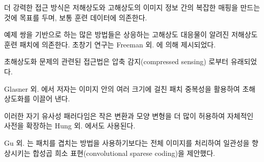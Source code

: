 \documentclass[10pt,twocolumn,letterpaper]{article}
\newcommand{\kor}[1]{#1}
\newcommand{\eng}[1]{}
\begin{document}
\eng{
More powerful approaches aim to establish a complex mapping between low- and high-resolution image information and usually rely on training data.
}\kor{
더 강력한 접근 방식은 저해상도와 고해상도의 이미지 정보 간의 복잡한 매핑을 만드는 것에 목표를 두며, 보통 훈련 데이터에 의존한다.
}\eng{
Many methods that are based on example-pairs rely on \ac{LR} training patches for which the corresponding \ac{HR} counterparts are known. Early work was presented by Freeman et al. \cite{Freeman2000,Freeman2002}.
}\kor{
예제 쌍을 기반으로 하는 많은 방법들은 상응하는 \ac{고해상도} 대응물이 알려진 \ac{저해상도} 훈련 패치에 의존한다. 초창기 연구는 Freeman 외. \cite{Freeman2000,Freeman2002}에 의해 제시되었다.
}\eng{
Related approaches to the \ac{SR} problem originate in compressed sensing \cite{Yang08, Dong2011, zeyde2012single}.
}\kor{
\ac{초해상도화} 문제의 관련된 접근법은 압축 감지(compressed sensing) \cite{Yang08, Dong2011, zeyde2012single}로부터 유래되었다.
}
    \eng{
    In Glasner et al. \cite{glasner2009super} the authors exploit patch redundancies across scales within the image to drive the \ac{SR}.
    }\kor{
    Glasner 외. \cite{glasner2009super}에서 저자는 이미지 안의 여러 크기에 걸친 패치 중복성을 활용하여 \ac{초해상도화}를 이끌어 낸다.
    } \eng{
    This paradigm of self-similarity is also employed in Huang et al. \cite{Huang15selfexemplars}, where self dictionaries are extended by further allowing for small transformations and shape variations.
    }\kor{
    이러한 자기 유사성 패러다임은 작은 변환과 모양 변형을 더 많이 허용하여 자체적인 사전을 확장하는 Hung 외. \cite{Huang15selfexemplars}에서도 사용된다.
    }
\eng{
Gu et al. \cite{gu2015convolutional} proposed a convolutional sparse coding approach that improves consistency by processing the whole image rather than overlapping patches.
}\kor{
Gu 외. \cite{gu2015convolutional}는 패치를 겹치는 방법을 사용하기보다는 전체 이미지를 처리하여 일관성을 향상시키는 합성곱 희소 표현(convolutional sparese coding)을 제안했다.
}
\end{document}
